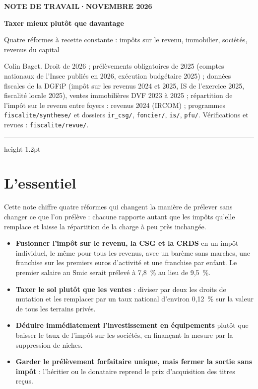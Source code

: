 \documentclass[11pt,a4paper]{article}
\begin{document}
\renewcommand{\figurename}{Figure}\renewcommand{\tablename}{Tableau}

\thispagestyle{empty}
\vspace*{0.6cm}
{\footnotesize\color{ocre}\bfseries NOTE DE TRAVAIL\quad·\quad NOVEMBRE 2026\par}
\vspace{8pt}
{\fontsize{22}{26}\selectfont\bfseries\color{bleu}Taxer mieux plutôt que davantage\par}
\vspace{6pt}
{\large Quatre réformes à recette constante : impôts sur le revenu, immobilier, sociétés, revenus du capital\par}
\vspace{8pt}
{\small Colin Baget. Droit de 2026 ; prélèvements obligatoires de 2025 (comptes nationaux de l'Insee publiés en 2026,
exécution budgétaire 2025) ; données fiscales de la DGFiP (impôt sur les revenus 2024 et 2025, IS de l'exercice 2025,
fiscalité locale 2025), ventes immobilières DVF 2023 à 2025 ; répartition de l'impôt sur le revenu entre foyers : revenus 2024
(IRCOM) ; programmes \texttt{fiscalite/synthese/} et dossiers \texttt{ir\_csg/}, \texttt{foncier/}, \texttt{is/},
\texttt{pfu/}. Vérifications et revues : \texttt{fiscalite/revue/}.\par}
\vspace{6pt}
{\color{bleu}\hrule height 1.2pt}
\vspace{4pt}

\section*{L'essentiel}

Cette note chiffre quatre réformes qui changent la manière de prélever sans changer ce que l'on prélève : chacune
rapporte autant que les impôts qu'elle remplace et laisse la répartition de la charge à peu près inchangée.

\begin{itemize}\setlength{\itemsep}{1pt}
\item \textbf{Fusionner l'impôt sur le revenu, la CSG et la CRDS} en un impôt individuel, le même pour tous les revenus,
avec un barème sans marches, une franchise sur les premiers euros d'activité et une franchise par enfant. Le premier
salaire au Smic serait prélevé à 7,8~\% au lieu de 9,5~\%.
\item \textbf{Taxer le sol plutôt que les ventes} : diviser par deux les droits de mutation et les remplacer par un
taux national d'environ 0,12~\% sur la valeur de tous les terrains privés.
\item \textbf{Déduire immédiatement l'investissement en équipements} plutôt que baisser le taux de l'impôt sur les
sociétés, en finançant la mesure par la suppression de niches.
\item \textbf{Garder le prélèvement forfaitaire unique, mais fermer la sortie sans impôt} : l'héritier ou le
donataire reprend le prix d'acquisition des titres reçus.
\end{itemize}
\end{document}

